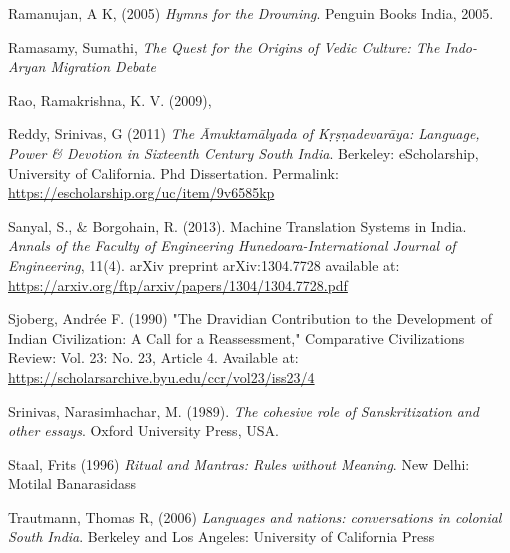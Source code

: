 \begin{thebibliography}{99}
  Ramanujan, A K, (2005) \textit{Hymns for the Drowning}. Penguin Books India, 2005.

  Ramasamy, Sumathi, \textit{The Quest for the Origins of Vedic Culture: The Indo-Aryan Migration Debate}

  Rao, Ramakrishna, K. V. (2009), 

  Reddy, Srinivas, G (2011) \textit{The Āmuktamālyada of Kṛṣṇadevarāya: Language, Power \& Devotion in Sixteenth Century South India}. Berkeley: eScholarship, University of California. Phd Dissertation. Permalink: \url{https://escholarship.org/uc/item/9v6585kp}

  Sanyal, S., \& Borgohain, R. (2013). Machine Translation Systems in India. \textit{Annals of the Faculty of Engineering Hunedoara-International Journal of Engineering}, 11(4). arXiv preprint arXiv:1304.7728 available at: \url{https://arxiv.org/ftp/arxiv/papers/1304/1304.7728.pdf}

  Sjoberg, Andrée F. (1990) "The Dravidian Contribution to the Development of Indian Civilization: A Call for a Reassessment," Comparative Civilizations Review: Vol. 23: No. 23, Article 4. Available at: \url{https://scholarsarchive.byu.edu/ccr/vol23/iss23/4}

  Srinivas, Narasimhachar, M. (1989). \textit{The cohesive role of Sanskritization and other essays}. Oxford University Press, USA.

  Staal, Frits (1996) \textit{Ritual and Mantras: Rules without Meaning}. New Delhi: Motilal Banarasidass

  Trautmann, Thomas R, (2006) \textit{Languages and nations: conversations in colonial South India}. Berkeley and Los Angeles: University of California Press

 \end{thebibliography}

\theendnotes

